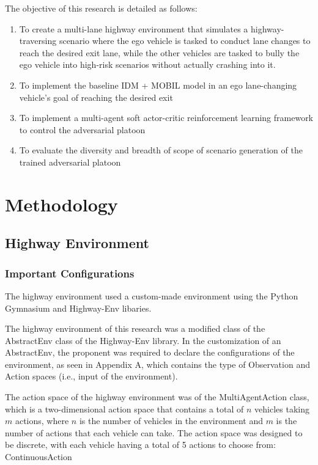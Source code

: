 \documentclass[12pt, a4paper]{report}
\begin{document}
The objective of this research is detailed as follows: 
\begin{enumerate}
    \item To create a multi-lane highway environment that simulates a highway-traversing scenario where 
    the ego vehicle is tasked to conduct lane changes to reach the desired exit lane, while the other 
    vehicles are tasked to bully the ego vehicle into high-risk scenarios without actually crashing into it.
    \item To implement the baseline IDM + MOBIL model in an ego lane-changing vehicle's goal of reaching the desired exit
    \item To implement a multi-agent soft actor-critic reinforcement learning framework to control the adversarial platoon
    \item To evaluate the diversity and breadth of scope of scenario generation of the trained adversarial platoon
\end{enumerate}

\section{Methodology}
\subsection{Highway Environment}

\subsubsection{Important Configurations}

The highway environment used a custom-made environment using the Python Gymnasium and Highway-Env libaries.

The highway environment of this research was a modified class of the AbstractEnv class of the Highway-Env library. In the customization of an AbstractEnv,
the proponent was required to declare the configurations of the environment, as seen in Appendix A, which contains the type of Observation and Action spaces (i.e., input
of the environment).

The action space of the highway environment was of the MultiAgentAction class, which is a two-dimensional action space that contains a total of $n$ vehicles taking $m$ actions, where $n$ is the number of vehicles in the environment and $m$ is the number of actions that each vehicle can take. The action space was designed to be discrete, with each vehicle having a total of 5 actions to choose from:
ContinuousAction
\end{document}
